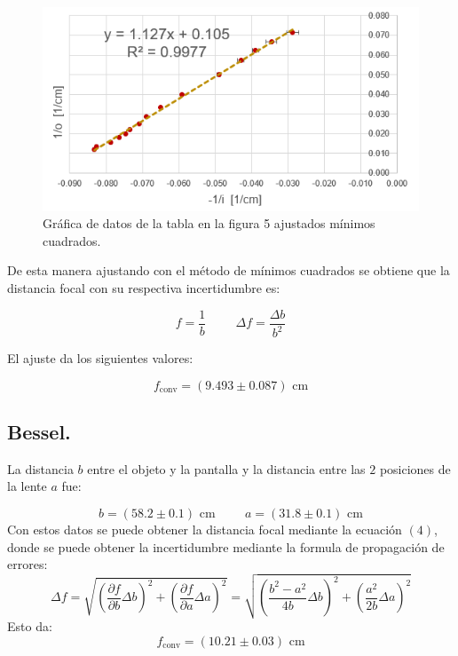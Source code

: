\documentclass[DIV=calc, paper=a4, fontsize=10pt]{scrartcl}
\begin{document}
\begin{figure}[H]
    \centering
    \includegraphics[scale=0.8]{graficass/metodo grafico.PNG}
    \caption{Gráfica de datos de la tabla en la figura 5 ajustados mínimos cuadrados.}
\end{figure}

De esta manera ajustando con el método de mínimos cuadrados se obtiene que la distancia focal con su respectiva incertidumbre es:

\begin{equation*}
    f = \frac{1}{b} \hspace{1cm} \Delta f = \frac{\Delta b}{b^2}
\end{equation*}

El ajuste da los siguientes valores:

\begin{equation*}
    f_{\text{conv}} = (9.493 \pm 0.087) \text{ cm}
\end{equation*}





\subsection*{\textcolor{carmine}{Bessel.}}

La distancia $b$ entre el objeto y la pantalla y la distancia entre las $2$ posiciones de la lente $a$ fue:

\begin{equation*}
    b= (58.2 \pm 0.1)  \text{ cm} \hspace{1cm} a = (31.8 \pm 0.1) \text{ cm}
\end{equation*}
Con estos datos se puede obtener la distancia focal mediante la ecuación $(4)$, donde se puede obtener la incertidumbre mediante la formula de propagación de errores:
\begin{equation*}
    \Delta f = \sqrt{\left(\frac{\partial f}{\partial b}\Delta b\right)^{2} + \left(\frac{\partial f}{\partial a} \Delta a\right)^{2}} = \sqrt{\left(\frac{b^2 - a^2}{4b}\Delta b\right)^{2} + \left(\frac{a^2}{2b}\Delta a\right)^{2}}
\end{equation*}
Esto da:
\begin{equation*}
    f_{\text{conv}} = (10.21 \pm 0.03) \text{ cm}
\end{equation*}
\end{document}
